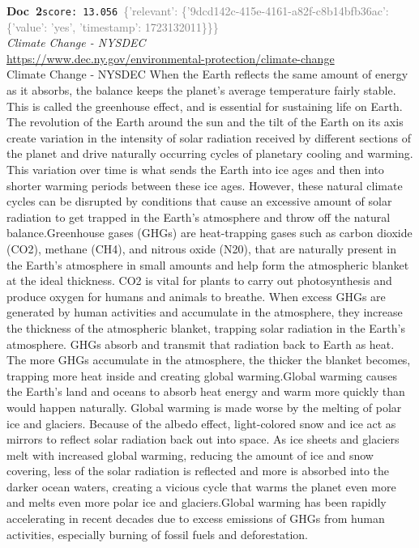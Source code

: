 \documentclass[a4paper,11pt]{article}
\begin{document}
\begin{docenv}
{\footnotesize\textcolor{doccolor}{\textbf{Doc~2}}}\hfill{\tiny\texttt{score:~13.056}}\ {\tiny\textcolor{gray}{\{'relevant': \{'9dcd142c-415e-4161-a82f-c8b14bfb36ac': \{'value': 'yes', 'timestamp': 1723132011\}\}\}}}\\[3pt]
{\small\textit{Climate Change - NYSDEC}}\\[2pt]
{\tiny\url{https://www.dec.ny.gov/environmental-protection/climate-change}}\\[4pt]
{\footnotesize Climate Change - NYSDEC
When the Earth reflects the same amount of energy as it absorbs, the balance keeps the planet's average temperature fairly stable. This is called the greenhouse effect, and is essential for sustaining life on Earth. The revolution of the Earth around the sun and the tilt of the Earth on its axis create variation in the intensity of solar radiation received by different sections of the planet and drive naturally occurring cycles of planetary cooling and warming. This variation over time is what sends the Earth into ice ages and then into shorter warming periods between these ice ages. However, these natural climate cycles can be disrupted by conditions that cause an excessive amount of solar radiation to get trapped in the Earth's atmosphere and throw off the natural balance.Greenhouse gases (GHGs) are heat-trapping gases such as carbon dioxide (CO2), methane (CH4), and nitrous oxide (N20), that are naturally present in the Earth's atmosphere in small amounts and help form the atmospheric blanket at the ideal thickness. CO2 is vital for plants to carry out photosynthesis and produce oxygen for humans and animals to breathe. When excess GHGs are generated by human activities and accumulate in the atmosphere, they increase the thickness of the atmospheric blanket, trapping solar radiation in the Earth's atmosphere. GHGs absorb and transmit that radiation back to Earth as heat. The more GHGs accumulate in the atmosphere, the thicker the blanket becomes, trapping more heat inside and creating global warming.Global warming causes the Earth's land and oceans to absorb heat energy and warm more quickly than would happen naturally. Global warming is made worse by the melting of polar ice and glaciers. Because of the albedo effect, light-colored snow and ice act as mirrors to reflect solar radiation back out into space. As ice sheets and glaciers melt with increased global warming, reducing the amount of ice and snow covering, less of the solar radiation is reflected and more is absorbed into the darker ocean waters, creating a vicious cycle that warms the planet even more and melts even more polar ice and glaciers.Global warming has been rapidly accelerating in recent decades due to excess emissions of GHGs from human activities, especially burning of fossil fuels and deforestation.}
\end{docenv}
\end{document}
